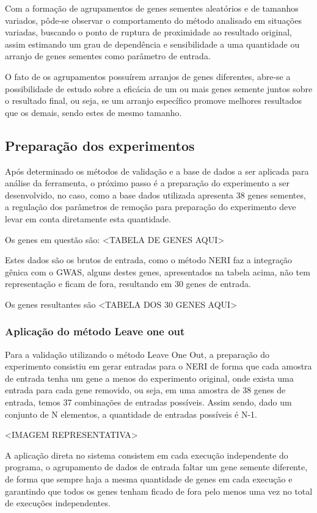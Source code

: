 Com a formação de agrupamentos de genes sementes aleatórios e de tamanhos variados, pôde-se observar o comportamento do método analisado em situações variadas, buscando o ponto de ruptura de proximidade ao resultado original, assim estimando um grau de dependência e sensibilidade a uma quantidade ou arranjo de genes sementes como parâmetro de entrada.

O fato de os agrupamentos possuírem arranjos de genes diferentes, abre-se a possibilidade de estudo sobre a eficácia de um ou mais genes semente juntos sobre o resultado final, ou seja, se um arranjo específico promove melhores resultados que os demais, sendo estes de mesmo tamanho.

\subsection{Preparação dos experimentos}

Após determinado os métodos de validação e a base de dados a ser aplicada para análise da ferramenta, o próximo passo é a preparação do experimento a ser desenvolvido, no caso, como a base dados utilizada apresenta 38 genes sementes, a regulação dos parâmetros de remoção para preparação do experimento deve levar em conta diretamente esta quantidade.

Os genes em questão são:
<TABELA DE GENES AQUI>

Estes dados são os brutos de entrada, como o método NERI faz a integração gênica com o GWAS, alguns destes genes, apresentados na tabela acima, não tem representação e ficam de fora, resultando em 30 genes de entrada.

Os genes resultantes são
<TABELA DOS 30 GENES AQUI>

\subsubsection{Aplicação do método Leave one out}

Para a validação utilizando o método Leave One Out, a preparação do experimento consistiu em gerar entradas para o NERI de forma que cada amostra de entrada tenha um gene a menos do experimento original, onde exista uma entrada para cada gene removido, ou seja, em uma amostra de 38 genes de entrada, temos 37 combinações de entradas possíveis. 
Assim sendo, dado um conjunto de N elementos, a quantidade de entradas possíveis é N-1.

<IMAGEM REPRESENTATIVA>

A aplicação direta no sistema consistem em cada execução independente do programa, o agrupamento de dados de entrada faltar um gene semente diferente, de forma que sempre haja a mesma quantidade de genes em cada execução e garantindo que todos os genes tenham ficado de fora pelo menos uma vez no total de execuções independentes.

